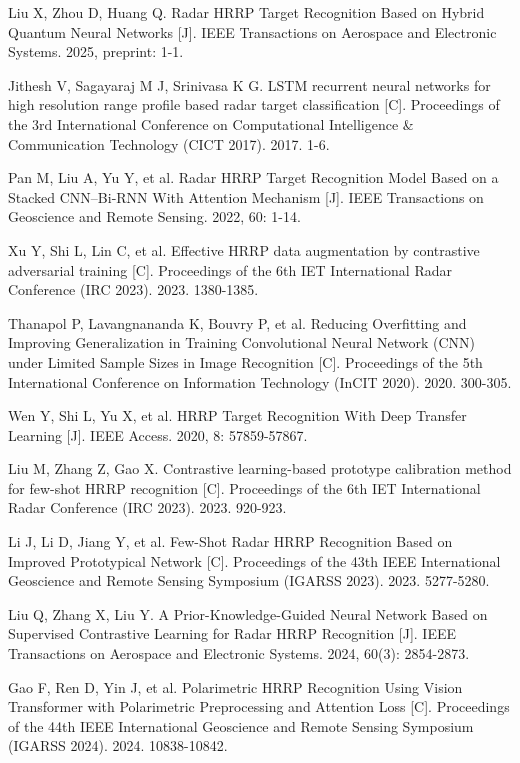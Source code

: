 \documentclass[doctor,twoside,ttf]{nudtpaper}
\begin{document}
\begin{thebibliography}{99}
 Liu X, Zhou D, Huang Q. Radar HRRP Target Recognition Based on Hybrid Quantum Neural Networks [J]. IEEE Transactions on Aerospace and Electronic Systems. 2025, preprint: 1-1.

 Jithesh V, Sagayaraj M J, Srinivasa K G. LSTM recurrent neural networks for high resolution range profile based radar target classification [C]. Proceedings of the 3rd International Conference on Computational Intelligence \& Communication Technology (CICT 2017). 2017. 1-6.

 Pan M, Liu A, Yu Y, et al. Radar HRRP Target Recognition Model Based on a Stacked CNN–Bi-RNN With Attention Mechanism [J]. IEEE Transactions on Geoscience and Remote Sensing. 2022, 60: 1-14.

 Xu Y, Shi L, Lin C, et al. Effective HRRP data augmentation by contrastive adversarial training [C]. Proceedings of the 6th IET International Radar Conference (IRC 2023). 2023. 1380-1385.

 Thanapol P, Lavangnananda K, Bouvry P, et al. Reducing Overfitting and Improving Generalization in Training Convolutional Neural Network (CNN) under Limited Sample Sizes in Image Recognition [C]. Proceedings of the 5th International Conference on Information Technology (InCIT 2020). 2020. 300-305.

 Wen Y, Shi L, Yu X, et al. HRRP Target Recognition With Deep Transfer Learning [J]. IEEE Access. 2020, 8: 57859-57867.

 Liu M, Zhang Z, Gao X. Contrastive learning-based prototype calibration method for few-shot HRRP recognition [C]. Proceedings of the 6th IET International Radar Conference (IRC 2023). 2023. 920-923.

 Li J, Li D, Jiang Y, et al. Few-Shot Radar HRRP Recognition Based on Improved Prototypical Network [C]. Proceedings of the 43th IEEE International Geoscience and Remote Sensing Symposium (IGARSS 2023). 2023. 5277-5280.

 Liu Q, Zhang X, Liu Y. A Prior-Knowledge-Guided Neural Network Based on Supervised Contrastive Learning for Radar HRRP Recognition [J]. IEEE Transactions on Aerospace and Electronic Systems. 2024, 60(3): 2854-2873.

 Gao F, Ren D, Yin J, et al. Polarimetric HRRP Recognition Using Vision Transformer with Polarimetric Preprocessing and Attention Loss [C]. Proceedings of the 44th IEEE International Geoscience and Remote Sensing Symposium (IGARSS 2024). 2024. 10838-10842.


\end{thebibliography}
\end{document}
